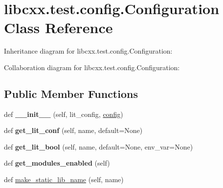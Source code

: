\hypertarget{classlibcxx_1_1test_1_1config_1_1_configuration}{}\section{libcxx.\+test.\+config.\+Configuration Class Reference}
\label{classlibcxx_1_1test_1_1config_1_1_configuration}


Inheritance diagram for libcxx.\+test.\+config.\+Configuration\+:


Collaboration diagram for libcxx.\+test.\+config.\+Configuration\+:
\subsection*{Public Member Functions}
\begin{DoxyCompactItemize}
\item 
\mbox{\label{classlibcxx_1_1test_1_1config_1_1_configuration_ab76ad5c47d7ef4a223ddb1e318eb7c06}} 
def {\bfseries \+\_\+\+\_\+init\+\_\+\+\_\+} (self, lit\+\_\+config, \mbox{\hyperlink{classconfig}{config}})
\item 
\mbox{\label{classlibcxx_1_1test_1_1config_1_1_configuration_a4da4819a998f892fd464efe8a9535ce7}} 
def {\bfseries get\+\_\+lit\+\_\+conf} (self, name, default=None)
\item 
\mbox{\label{classlibcxx_1_1test_1_1config_1_1_configuration_a1d5168c34459b85d08842c58605e0e90}} 
def {\bfseries get\+\_\+lit\+\_\+bool} (self, name, default=None, env\+\_\+var=None)
\item 
\mbox{\label{classlibcxx_1_1test_1_1config_1_1_configuration_ada473033fd0a651a1319c5bb0fb6a1c7}} 
def {\bfseries get\+\_\+modules\+\_\+enabled} (self)
\item 
def \mbox{\hyperlink{classlibcxx_1_1test_1_1config_1_1_configuration_abc51eef879457ae51d3f235627bc4099}{make\+\_\+static\+\_\+lib\+\_\+name}} (self, name)
\item 
\mbox{\label{classlibcxx_1_1test_1_1config_1_1_configuration_ace2f25e71a0ef1823cd10ace5d226b93}} 

\end{DoxyCompactItemize}
